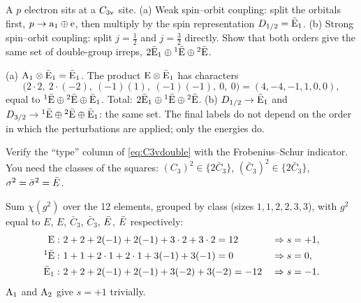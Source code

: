 \begin{exercise}\label{ex:5:SO}
A $p$ electron sits at a $C_{3\mathrm{v}}$ site. (a) Weak spin--orbit coupling: split the
orbitals first, $p\to\mathrm{a}_1\oplus\mathrm{e}$, then multiply by the spin representation
$D_{1/2}=\bar{\mathrm{E}}_1$. (b) Strong spin--orbit coupling: split $j=\tfrac12$ and
$j=\tfrac32$ directly. Show that both orders give the same set of double-group irreps,
$2\bar{\mathrm{E}}_1\oplus{}^{1}\bar{\mathrm{E}}\oplus{}^{2}\bar{\mathrm{E}}$.
\end{exercise}

\begin{solution}
(a) $\mathrm{A}_1\otimes\bar{\mathrm{E}}_1=\bar{\mathrm{E}}_1$. The product $\mathrm{E}\otimes\bar{\mathrm{E}}_1$
has characters
\[
\bigl(2\cdot2,\ 2\cdot(-2),\ (-1)(1),\ (-1)(-1),\ 0,\ 0\bigr)=(4,-4,-1,1,0,0),
\]
equal to ${}^{1}\bar{\mathrm{E}}\oplus{}^{2}\bar{\mathrm{E}}\oplus\bar{\mathrm{E}}_1$. Total:
$2\bar{\mathrm{E}}_1\oplus{}^{1}\bar{\mathrm{E}}\oplus{}^{2}\bar{\mathrm{E}}$.
(b) $D_{1/2}\to\bar{\mathrm{E}}_1$ and $D_{3/2}\to{}^{1}\bar{\mathrm{E}}\oplus{}^{2}\bar{\mathrm{E}}\oplus\bar{\mathrm{E}}_1$:
the same set. The final labels do not depend on the order in which the perturbations
are applied; only the energies do.
\end{solution}

\begin{exercise}\label{ex:5:FS}
Verify the ``type'' column of \eqref{eq:C3vdouble} with the Frobenius--Schur indicator.
You need the classes of the squares: $(C_3)^2\in\{2\bar{C}_3\}$,
$(\bar{C}_3)^2\in\{2\bar{C}_3\}$, $\sigma^2=\bar{\sigma}^2=\bar{E}$.
\end{exercise}

\begin{solution}
Sum $\chi(g^2)$ over the 12 elements, grouped by class (sizes $1,1,2,2,3,3$), with
$g^2$ equal to $E$, $E$, $\bar C_3$, $\bar C_3$, $\bar{E}$, $\bar{E}$ respectively:
\begin{align*}
\mathrm{E}:&\ 2+2+2(-1)+2(-1)+3\cdot2+3\cdot2=12 &&\Rightarrow s=+1,\\
{}^{1}\bar{\mathrm{E}}:&\ 1+1+2\cdot1+2\cdot1+3(-1)+3(-1)=0 &&\Rightarrow s=0,\\
\bar{\mathrm{E}}_1:&\ 2+2+2(-1)+2(-1)+3(-2)+3(-2)=-12 &&\Rightarrow s=-1.
\end{align*}
$\mathrm{A}_1$ and $\mathrm{A}_2$ give $s=+1$ trivially.
\end{solution}
